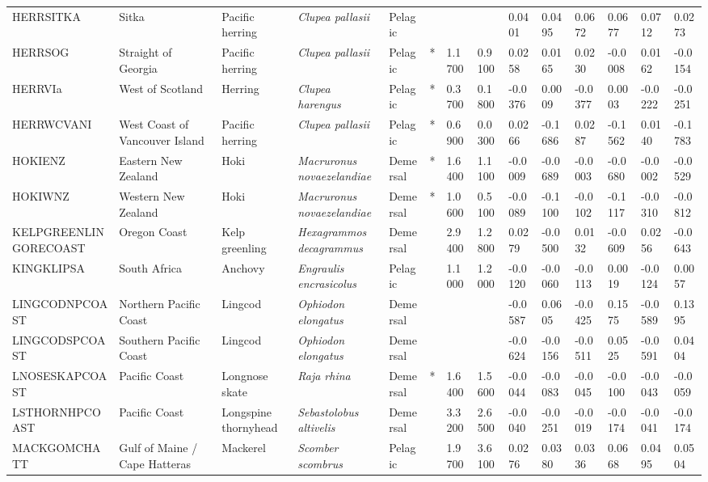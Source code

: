 \begin{longtable}{p{2.8cm}p{2cm}p{1.7cm}p{1.7cm}p{1cm}p{0.3cm}p{1cm}p{1cm}p{1cm}p{1cm}p{1cm}p{1cm}p{1cm}p{1cm}}
  HERRSITKA & Sitka & Pacific herring & \textit{Clupea pallasii} & Pelagic &  &  &  & 0.0401 & 0.0495 & 0.0672 & 0.0677 & 0.0712 & 0.0273 \\ 
  HERRSOG & Straight of Georgia & Pacific herring & \textit{Clupea pallasii} & Pelagic & * & 1.1700 & 0.9100 & 0.0258 & 0.0165 & 0.0230 & -0.0008 & 0.0162 & -0.0154 \\ 
  HERRVIa & West of Scotland & Herring & \textit{Clupea harengus} & Pelagic & * & 0.3700 & 0.1800 & -0.0376 & 0.0009 & -0.0377 & 0.0003 & -0.0222 & -0.0251 \\ 
  HERRWCVANI & West Coast of Vancouver Island & Pacific herring & \textit{Clupea pallasii} & Pelagic & * & 0.6900 & 0.0300 & 0.0266 & -0.1686 & 0.0287 & -0.1562 & 0.0140 & -0.1783 \\ 
  HOKIENZ & Eastern New Zealand & Hoki & \textit{Macruronus novaezelandiae} & Demersal & * & 1.6400 & 1.1100 & -0.0009 & -0.0689 & -0.0003 & -0.0680 & -0.0002 & -0.0529 \\ 
  HOKIWNZ & Western New Zealand & Hoki & \textit{Macruronus novaezelandiae} & Demersal & * & 1.0600 & 0.5100 & -0.0089 & -0.1100 & -0.0102 & -0.1117 & -0.0310 & -0.0812 \\ 
  KELPGREENLINGORECOAST & Oregon Coast & Kelp greenling & \textit{Hexagrammos decagrammus} & Demersal &   & 2.9400 & 1.2800 & 0.0279 & -0.0500 & 0.0132 & -0.0609 & 0.0256 & -0.0643 \\ 
  KINGKLIPSA & South Africa & Anchovy & \textit{Engraulis encrasicolus} & Pelagic &   & 1.1000 & 1.2000 & -0.0120 & -0.0060 & -0.0113 & 0.0019 & -0.0124 & 0.0057 \\ 
  LINGCODNPCOAST & Northern Pacific Coast & Lingcod & \textit{Ophiodon elongatus} & Demersal &  &  &  & -0.0587 & 0.0605 & -0.0425 & 0.1575 & -0.0589 & 0.1395 \\ 
  LINGCODSPCOAST & Southern Pacific Coast & Lingcod & \textit{Ophiodon elongatus} & Demersal &  &  &  & -0.0624 & -0.0156 & -0.0511 & 0.0525 & -0.0591 & 0.0404 \\ 
  LNOSESKAPCOAST & Pacific Coast & Longnose skate & \textit{Raja rhina} & Demersal & * & 1.6400 & 1.5600 & -0.0044 & -0.0083 & -0.0045 & -0.0100 & -0.0043 & -0.0059 \\ 
  LSTHORNHPCOAST & Pacific Coast & Longspine thornyhead & \textit{Sebastolobus altivelis} & Demersal &   & 3.3200 & 2.6500 & -0.0040 & -0.0251 & -0.0019 & -0.0174 & -0.0041 & -0.0174 \\ 
  MACKGOMCHATT & Gulf of Maine / Cape Hatteras & Mackerel & \textit{Scomber scombrus} & Pelagic &   & 1.9700 & 3.6100 & 0.0276 & 0.0380 & 0.0336 & 0.0668 & 0.0495 & 0.0504 \\ 

\end{longtable}
